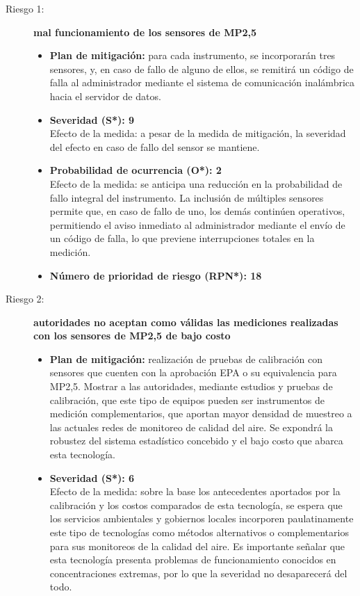\begin{description}
	\item[Riesgo 1:]\textbf{mal funcionamiento de los sensores de MP2,5}
	\begin{itemize}
		\item \textbf{Plan de mitigación:} para cada instrumento, se incorporarán tres sensores, y, en caso de fallo de alguno de ellos, se remitirá un código de falla al administrador mediante el sistema de comunicación inalámbrica hacia el servidor de datos.
		\item \textbf{Severidad (S*): 9} \\
		Efecto de la medida: a pesar de la medida de mitigación, la severidad del efecto en caso de fallo del sensor se mantiene.
		\item \textbf{Probabilidad de ocurrencia (O*): 2} \\
		Efecto de la medida: se anticipa una reducción en la probabilidad de fallo integral del instrumento. La inclusión de múltiples sensores permite que, en caso de fallo de uno, los demás continúen operativos, permitiendo el aviso inmediato al administrador mediante el envío de un código de falla, lo que previene interrupciones totales en la medición.
		\item \textbf{Número de prioridad de riesgo (RPN*): 18}
	\end{itemize}
	
	\item[Riesgo 2:] \textbf{autoridades no aceptan como válidas las mediciones realizadas con los sensores de MP2,5 de bajo costo}  	 
	\begin{itemize}
		
		\item \textbf{Plan de mitigación:} realización de pruebas de calibración con sensores que cuenten con la aprobación EPA o su equivalencia para MP2,5. Mostrar a las autoridades, mediante estudios y pruebas de calibración, que este tipo de equipos pueden ser instrumentos de medición complementarios, que aportan mayor densidad  de muestreo a las actuales redes de monitoreo de calidad del aire. Se expondrá la robustez del sistema estadístico concebido y el bajo costo que abarca esta tecnología.   
		\item \textbf{Severidad (S*): 6} \\
		Efecto de la medida: sobre la base los antecedentes aportados por la calibración y los costos comparados de esta tecnología, se espera que los servicios ambientales y gobiernos locales incorporen paulatinamente este tipo de tecnologías como métodos alternativos o complementarios para sus monitoreos de la calidad del aire. Es importante señalar que esta tecnología presenta problemas de funcionamiento conocidos en concentraciones extremas, por lo que la severidad no desaparecerá del todo.
		

\end{itemize}
\end{description}
